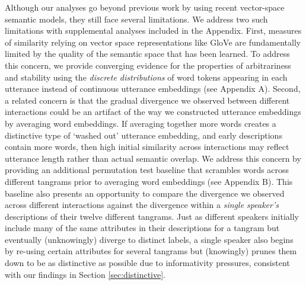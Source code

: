 \documentclass[alpha-refs]{wiley-article}
\begin{document}
Although our analyses go beyond previous work by using recent vector-space semantic models, they still face several limitations.
We address two such limitations with supplemental analyses included in the Appendix.
First, measures of similarity relying on vector space representations like GloVe are fundamentally limited by the quality of the semantic space that has been learned.
To address this concern, we provide converging evidence for the properties of arbitrariness and stability using the \emph{discrete distributions} of word tokens appearing in each utterance instead of continuous utterance embeddings (see Appendix A).
Second, a related concern is that the gradual divergence we observed between different interactions could be an artifact of the way we constructed utterance embeddings by averaging word embeddings.
If averaging together more words creates a distinctive type of `washed out' utterance embedding, and early descriptions contain more words, then high initial similarity across interactions may reflect utterance length rather than actual semantic overlap.
We address this concern by providing an additional permutation test baseline that scrambles words across different tangrams prior to averaging word embeddings (see Appendix B).
This baseline also presents an opportunity to compare the divergence we observed across different interactions against the divergence within a \emph{single speaker's} descriptions of their twelve different tangrams.
Just as different speakers initially include many of the same attributes in their descriptions for a tangram but eventually (unknowingly) diverge to distinct labels, a single speaker also begins by re-using certain attributes for several tangrams but (knowingly) prunes them down to be as distinctive as possible due to informativity pressures, consistent with our findings in Section \ref{sec:distinctive}.

\end{document}
